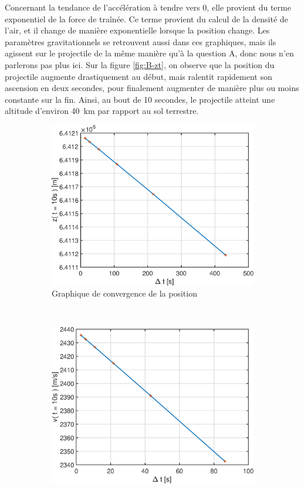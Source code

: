 \documentclass[a4paper,12pt,twoside]{article}
\begin{document}
Concernant la tendance de l'accélération à tendre vers 0, elle provient du terme exponentiel de la force de traînée.
Ce terme provient du calcul de la densité de l'air, et il change de manière exponentielle lorsque la position change.
Les paramètres gravitationnels se retrouvent aussi dans ces graphiques, mais ils agissent sur le projectile de la même manière qu'à la question A, donc nous n'en parlerons pas plus ici.
Sur la figure \ref{fig:B-zt}, on observe que la position du projectile augmente drastiquement au début, mais ralentit rapidement son ascension en deux secondes, pour finalement augmenter de manière plus ou moins constante sur la fin.
Ainsi, au bout de 10 secondes, le projectile atteint une altitude d'environ \SI{40}{\kilo\meter} par rapport au sol terrestre.\\

\begin{figure}[h]
	\centering
	\begin{subfigure}[b]{0.45\textwidth}
		\includegraphics[width=\textwidth]{graphs/zConvB.eps}
		\caption{Graphique de convergence de la position}
		\label{fig:B-zConv}
	\end{subfigure}
	~
	\begin{subfigure}[b]{0.45\textwidth}
		\includegraphics[width=\textwidth]{graphs/vConvB.eps}

\end{subfigure}
\end{figure}
\end{document}
